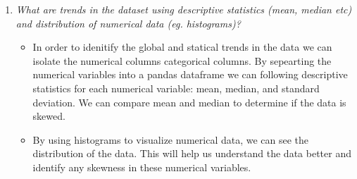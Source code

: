 \documentclass{article}%
\begin{document}
\begin{enumerate}
\begin{itemize}
\end{itemize}%
\item%
\textit{What are trends in the dataset using descriptive statistics (mean, median etc) and distribution of numerical data (eg. histograms)?}%
\begin{itemize}%
\item%
In order to idenitify the global and statical trends in the data we can isolate the numerical columns categorical columns. By sepearting the numerical variables into a pandas dataframe we can                 following descriptive statistics for each numerical variable: mean, median, and standard deviation.                 We can compare mean and median to determine if the data is skewed.%
\item%
By using histograms to visualize numerical data, we can see the distribution of the data. This will help us understand the data better and identify any skewness in these numerical variables.%
\end{itemize}%
\end{enumerate}

%
\end{document}
